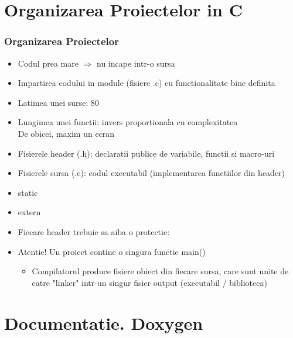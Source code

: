 \documentclass{beamer}
\begin{document}
\section{Organizarea Proiectelor in C}
  
  \frame{\tableofcontents[currentsection]}

  \begin{frame}[allowframebreaks]  
  \frametitle{Organizarea Proiectelor}
  \begin{itemize}
  \setlength{\itemsep}{0.5cm}
  \item Codul prea mare $\Rightarrow$ nu incape intr-o sursa
  \item Impartirea codului in module (fisiere .c) cu functionalitate bine definita
  \item Latimea unei surse: 80
  \item Lungimea unei functii: invers proportionala cu complexitatea\\De obicei, maxim un ecran
  \framebreak
  \item Fisierele header (.h): declaratii publice de variabile, functii si macro-uri
  \item Fisierele sursa (.c): codul executabil (implementarea functiilor din header)
  \vspace{1cm}
  \item {\ttfamily static}
  \item {\ttfamily extern}
  \framebreak
  \item Fiecare header trebuie sa aiba o protectie:\\
  \framebreak
  \item Atentie! Un proiect contine o singura functie {\ttfamily main()}\begin{itemize} \item Compilatorul produce fisiere obiect din fiecare sursa, care sunt unite de catre "linker" intr-un singur fisier output (executabil / biblioteca)\end{itemize}
  \end{itemize}
  \end{frame}

\section{Documentatie. Doxygen}

  \frame{\tableofcontents[currentsection]}
\end{document}
